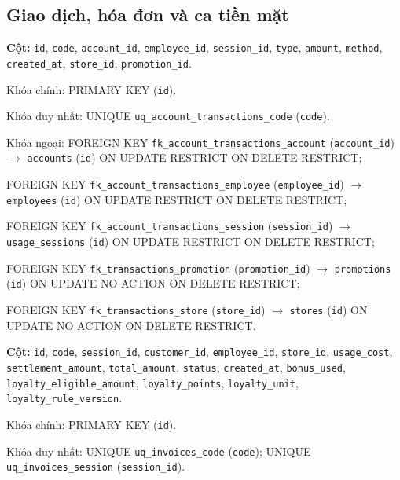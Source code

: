 \subsection{Giao dịch, hóa đơn và ca tiền mặt}

\begin{description}[leftmargin=3.6cm,labelwidth=3.4cm,style=nextline]

\item[\texttt{account\_transactions}] \textbf{Cột:} \texttt{id}, \texttt{code}, \texttt{account\_id}, \texttt{employee\_id}, \texttt{session\_id}, \texttt{type}, \texttt{amount}, \texttt{method}, \texttt{created\_at}, \texttt{store\_id}, \texttt{promotion\_id}.

Khóa chính: PRIMARY KEY (\texttt{id}).

Khóa duy nhất: UNIQUE \texttt{uq\_account\_transactions\_code} (\texttt{code}).

Khóa ngoại: FOREIGN KEY \texttt{fk\_account\_transactions\_account} (\texttt{account\_id}) $\rightarrow$ \texttt{accounts} (\texttt{id}) ON UPDATE RESTRICT ON DELETE RESTRICT;\par FOREIGN KEY \texttt{fk\_account\_transactions\_employee} (\texttt{employee\_id}) $\rightarrow$ \texttt{employees} (\texttt{id}) ON UPDATE RESTRICT ON DELETE RESTRICT;\par FOREIGN KEY \texttt{fk\_account\_transactions\_session} (\texttt{session\_id}) $\rightarrow$ \texttt{usage\_sessions} (\texttt{id}) ON UPDATE RESTRICT ON DELETE RESTRICT;\par FOREIGN KEY \texttt{fk\_transactions\_promotion} (\texttt{promotion\_id}) $\rightarrow$ \texttt{promotions} (\texttt{id}) ON UPDATE NO ACTION ON DELETE RESTRICT;\par FOREIGN KEY \texttt{fk\_transactions\_store} (\texttt{store\_id}) $\rightarrow$ \texttt{stores} (\texttt{id}) ON UPDATE NO ACTION ON DELETE RESTRICT.

\item[\texttt{invoices}] \textbf{Cột:} \texttt{id}, \texttt{code}, \texttt{session\_id}, \texttt{customer\_id}, \texttt{employee\_id}, \texttt{store\_id}, \texttt{usage\_cost}, \texttt{settlement\_amount}, \texttt{total\_amount}, \texttt{status}, \texttt{created\_at}, \texttt{bonus\_used}, \texttt{loyalty\_eligible\_amount}, \texttt{loyalty\_points}, \texttt{loyalty\_unit}, \texttt{loyalty\_rule\_version}.

Khóa chính: PRIMARY KEY (\texttt{id}).

Khóa duy nhất: UNIQUE \texttt{uq\_invoices\_code} (\texttt{code}); UNIQUE \texttt{uq\_invoices\_session} (\texttt{session\_id}).


\end{description}
